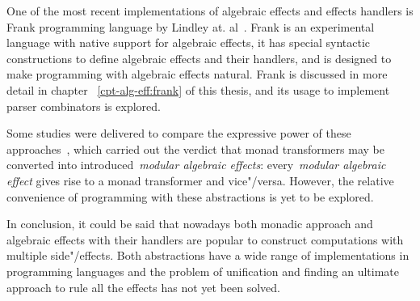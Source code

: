 One of the most recent implementations of algebraic effects and effects handlers
is Frank programming language by Lindley at. al~\cite{DBLP:conf/popl/LindleyMM17}.
Frank is an experimental language
with native support for algebraic effects, it has special syntactic constructions
to define algebraic effects and their handlers, and is designed to make programming
with algebraic effects natural. Frank is discussed in more detail in chapter
~\ref{cpt-alg-eff:frank} of this thesis, and its usage to implement parser
combinators is explored.

Some studies were delivered to compare the expressive power of these
approaches~\cite{DBLP:journals/corr/ForsterKLP16}, which carried out the verdict
that monad transformers may be converted into introduced~\emph{modular algebraic
effects}: every~\emph{modular algebraic effect} gives rise to a monad transformer
and vice"/versa. However, the relative convenience of programming with these abstractions
is yet to be explored.

In conclusion, it could be said that nowadays both monadic approach and algebraic
effects with their handlers are popular to construct computations with multiple
side"/effects. Both abstractions have a wide range of implementations in programming
languages and the problem of unification and finding an ultimate approach to rule
all the effects has not yet been solved.
